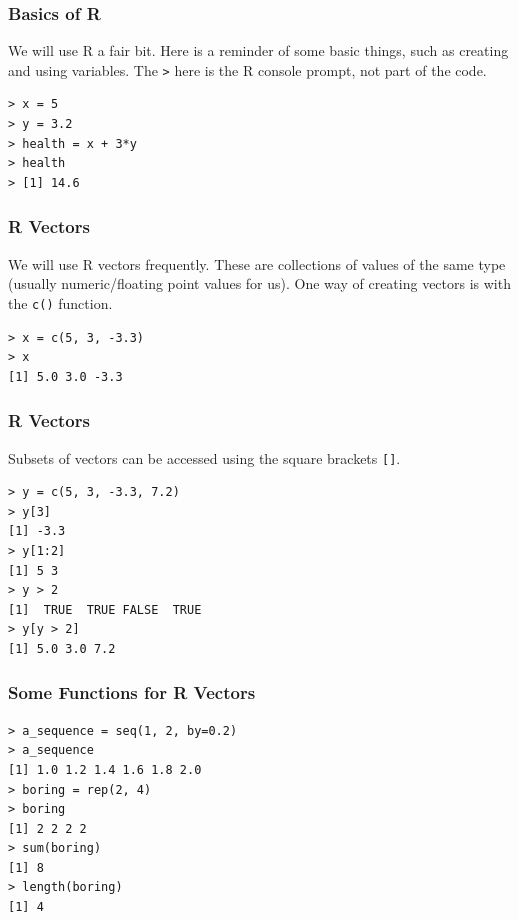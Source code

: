\documentclass{beamer}
\begin{document}
\begin{frame}[fragile]
\frametitle{Basics of R}
We will use R a fair bit. Here is a reminder of some basic
things, such as creating and using variables. The \texttt{>}
here is the R console prompt, not part of the code.
\begin{verbatim}
> x = 5
> y = 3.2
> health = x + 3*y
> health
> [1] 14.6
\end{verbatim}

\end{frame}

\begin{frame}[fragile]
\frametitle{R Vectors}
We will use R vectors frequently. These are collections of values of the
same type (usually numeric/floating point values for us).
One way of creating vectors is with the \texttt{c()} function.
\begin{verbatim}
> x = c(5, 3, -3.3)
> x
[1] 5.0 3.0 -3.3
\end{verbatim}
\end{frame}

\begin{frame}[fragile]
\frametitle{R Vectors}
Subsets of vectors can be accessed using the square brackets
\texttt{[]}.
\begin{verbatim}
> y = c(5, 3, -3.3, 7.2)
> y[3]
[1] -3.3
> y[1:2]
[1] 5 3
> y > 2
[1]  TRUE  TRUE FALSE  TRUE
> y[y > 2]
[1] 5.0 3.0 7.2
\end{verbatim}
\end{frame}

\begin{frame}[fragile]
\frametitle{Some Functions for R Vectors}
\begin{verbatim}
> a_sequence = seq(1, 2, by=0.2)
> a_sequence
[1] 1.0 1.2 1.4 1.6 1.8 2.0
> boring = rep(2, 4)
> boring
[1] 2 2 2 2
> sum(boring)
[1] 8
> length(boring)
[1] 4
\end{verbatim}
\end{frame}
\end{document}
